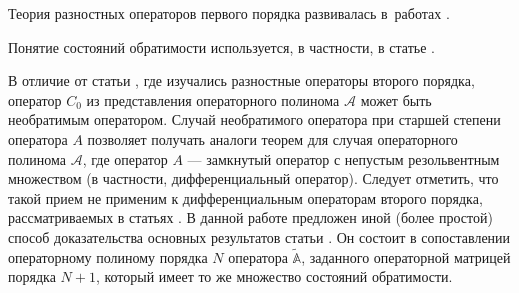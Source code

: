 Теория разностных операторов первого порядка развивалась в~работах \cite{antonevich2,antonevich,kurbatov,kurbatov2,massera,henri,megan,dorogovtsev,chicone,inverse1992,memory2014,green2015,BasDup15,BasPas01,Bas00,Bas13,Bas15,Bic10,Bic13,Bic14}.

Понятие состояний обратимости используется, в частности, в статье \cite{Bas13}.

В отличие от статьи \cite{BasDup15}, где изучались разностные операторы второго порядка, оператор $C_0$ из представления операторного полинома $\mathcal A$ может быть необратимым оператором. Случай необратимого оператора при старшей степени оператора $A$ позволяет получать аналоги теорем  для случая операторного полинома $\mathcal A$, где оператор $A$ --- замкнутый оператор с непустым резольвентным множеством (в частности, дифференциальный оператор). Следует отметить, что такой прием не применим к дифференциальным операторам второго порядка, рассматриваемых в статьях \cite{shkalikov,HryShk03}. В данной работе предложен иной (более простой) способ доказательства основных результатов статьи \cite{BasDup15}. Он состоит в сопоставлении операторному полиному порядка $N$ оператора $\widetilde{\mathbb A}$, заданного операторной матрицей порядка $N+1$, который имеет то же множество состояний обратимости.
